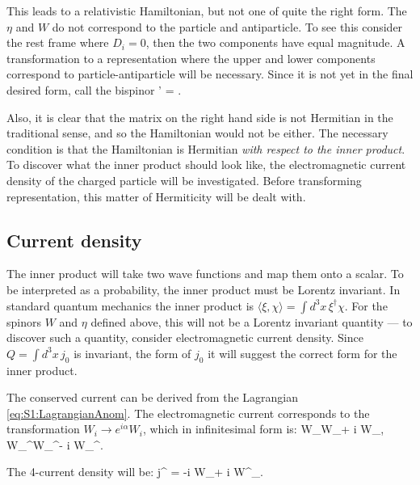 This leads to a relativistic Hamiltonian, but not one of quite the right form.  The $\eta$ and $W$ do not correspond to the particle and antiparticle.  To see this consider the rest frame where $D_i =0$, then the two components have equal magnitude.  A transformation to a representation where the upper and lower components correspond to particle-antiparticle will be necessary.  Since it is not yet in the final desired form, call the bispinor
 \beq
 	\Psig' = .
 \eeq

Also, it is clear that the matrix on the right hand side is not Hermitian in the traditional sense, and so the Hamiltonian would not be either.  The necessary condition is that the Hamiltonian is Hermitian \emph{with respect to the inner product}.  To discover what the inner product should look like, the electromagnetic current density of the charged particle will be investigated.  Before transforming representation, this matter of Hermiticity will be dealt with.


\subsection{Current density }

The inner product will take two wave functions and map them onto a scalar.  To be interpreted as a probability, the inner product must be Lorentz invariant.  In standard quantum mechanics the inner product is $\langle \xi, \chi \rangle = \int d^3x \, \xi^\dagger \chi$.  For the spinors $W$ and $\eta$ defined above, this will not be a Lorentz invariant quantity --- to discover such a quantity, consider electromagnetic current density.  Since $Q =  \int d^3x \, j_0$ is invariant, the form of $j_0$ it will suggest the correct form for the inner product.

The conserved current can be derived from the Lagrangian \eqref{eq:S1:LagrangianAnom}.  The electromagnetic current corresponds to the transformation $ W_i \to e^{i \alpha}W_i $, which in infinitesimal form is:
\beq
	W_\mu \to W_\mu + i \alpha W_\mu, \;
	W_\mu^\dagger \to W_\mu^\dagger - i \alpha W_\mu^{\dagger}.
\eeq

The 4-current density will be:
\beq
	j^{\sigma} = -i  W_\mu  +  i W^\dagger_\mu.
\eeq

